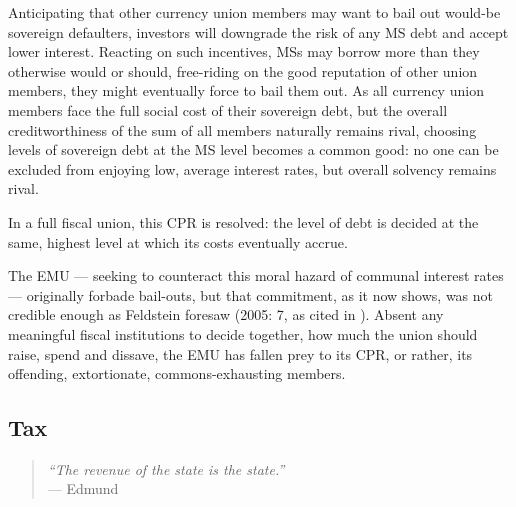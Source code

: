 \documentclass[11pt,a4paper,oneside]{article}
\begin{document}
Anticipating that other currency union members may want to bail out would-be sovereign defaulters, investors will downgrade the risk of any \gls{MS} debt and accept lower interest. 
Reacting on such incentives, \glspl{MS} may borrow more than they otherwise would or should, free-riding on the good reputation of other union members, they might eventually force to bail them out. 
As all currency union members face the full social cost of their sovereign debt, but the overall creditworthiness of the sum of all members naturally remains rival, choosing levels of sovereign debt at the \gls{MS} level becomes a common good: 
no one can be excluded from enjoying low, average interest rates, but overall solvency remains rival.

In a full fiscal union, this \gls{CPR} is resolved: 
the level of debt is decided at the same, highest level at which its costs eventually accrue. 

The \gls{EMU} --- seeking to counteract this moral hazard of communal interest rates --- originally forbade bail-outs, but that commitment, as it now shows, was not credible enough as Feldstein foresaw (2005: 7, as cited in \citealt[13]{Begg2008}). 
Absent any meaningful fiscal institutions to decide together, how much the union should raise, spend and dissave, the \gls{EMU} has fallen prey to its \gls{CPR}, or rather, its offending, extortionate, commons-exhausting members. 

\subsection{Tax}

\begin{quote}
	\emph{``The revenue of the state \emph{is} the state.''}\\
	--- Edmund \citet[111, emphasis added]{Burke1790}
\end{quote}
\end{document}
